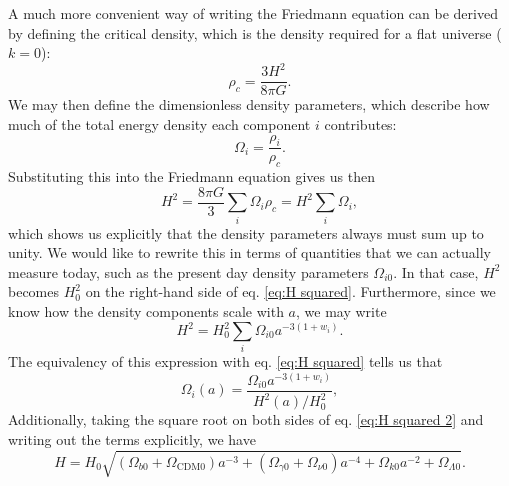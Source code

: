 \documentclass{aa}
\begin{document}
A much more convenient way of writing the Friedmann equation can be derived by defining the critical density, which is the density required for a flat universe ($k=0$):
\begin{equation}
  \rho_c = \frac{3 H^2}{8 \pi G}.
\end{equation}
We may then define the dimensionless density parameters, which describe how much of the total energy density each component $i$ contributes:
\begin{equation}
  \Omega_i = \frac{\rho_{i}}{\rho_c}.
\end{equation}
Substituting this into the Friedmann equation gives us then
\begin{equation}
  H^2 = \frac{8\pi G}{3} \sum_i \Omega_{i}\rho_c = H^2\sum_i \Omega_{i}, \label{eq:H squared}
\end{equation}
which shows us explicitly that the density parameters always must sum up to unity. We would like to rewrite this in terms of quantities that we can actually measure today, such as the present day density parameters $\Omega_{i0}$. In that case, $H^2$ becomes $H_0^2$ on the right-hand side of eq. \eqref{eq:H squared}. Furthermore, since we know how the density components scale with $a$, we may write
\begin{equation}
  H^2 = H_0^2\sum_i \Omega_{i0}a^{-3(1+w_i)}. \label{eq:H squared 2}
\end{equation} 
The equivalency of this expression with eq. \eqref{eq:H squared} tells us that
\begin{equation}
  \Omega_{i}(a) = \frac{\Omega_{i0}a^{-3(1+w_i)}}{H^2(a)/H_0^2}, \label{eq:density params}
\end{equation}
Additionally, taking the square root on both sides of eq. \eqref{eq:H squared 2} and writing out the terms explicitly, we have
\begin{equation}
    H = H_0 \sqrt{(\Omega_{b0} + \Omega_{\text{CDM}0}) a^{-3} + (\Omega_{\gamma 0} + \Omega_{\nu 0}) a^{-4} + \Omega_{k0} a^{-2} + \Omega_{\Lambda 0}}.
\end{equation}
\end{document}
